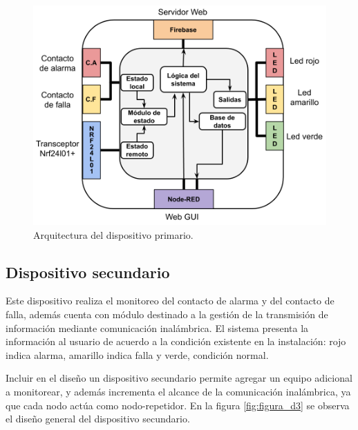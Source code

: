 \begin{figure}[]
	\centering
	\includegraphics[scale=.4]{./Figures/Capitulo3/Fig_C3.png}
	\caption{Arquitectura del dispositivo primario.}
	\label{fig:figura_c3}
\end{figure}

\subsection{Dispositivo secundario}

Este dispositivo realiza el  monitoreo del contacto de alarma y del contacto de falla, además cuenta con módulo destinado a la gestión de la transmisión de información mediante comunicación inalámbrica. El sistema presenta la información al usuario de acuerdo a la condición existente en la instalación: rojo indica alarma, amarillo indica falla y verde, condición normal.


Incluir en el diseño un dispositivo secundario permite agregar un equipo adicional a monitorear, y además incrementa el alcance de la comunicación inalámbrica, ya que cada nodo actúa como nodo-repetidor. En la figura \ref{fig:figura_d3} se observa el diseño general del dispositivo secundario.


